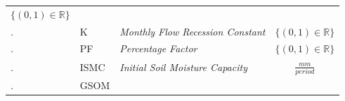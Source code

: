 \documentclass[11pt]{article}
\begin{document}
\begin{longtable}[]{@{}lllc@{}}
\begin{minipage}[t]{0.22\columnwidth}
\(\{\left(0, 1\right) \in\mathbb{R}\}\)\strut
\end{minipage}\tabularnewline
\begin{minipage}[t]{0.22\columnwidth}\raggedright
.\strut
\end{minipage} & \begin{minipage}[t]{0.22\columnwidth}\raggedright
K\strut
\end{minipage} & \begin{minipage}[t]{0.22\columnwidth}\raggedright
\emph{Monthly Flow Recession Constant}\strut
\end{minipage} & \begin{minipage}[t]{0.22\columnwidth}\centering
\(\{\left(0, 1\right) \in\mathbb{R}\}\)\strut
\end{minipage}\tabularnewline
\begin{minipage}[t]{0.22\columnwidth}\raggedright
.\strut
\end{minipage} & \begin{minipage}[t]{0.22\columnwidth}\raggedright
PF\strut
\end{minipage} & \begin{minipage}[t]{0.22\columnwidth}\raggedright
\emph{Percentage Factor}\strut
\end{minipage} & \begin{minipage}[t]{0.22\columnwidth}\centering
\(\{\left(0, 1\right) \in\mathbb{R}\}\)\strut
\end{minipage}\tabularnewline
\begin{minipage}[t]{0.22\columnwidth}\raggedright
.\strut
\end{minipage} & \begin{minipage}[t]{0.22\columnwidth}\raggedright
ISMC\strut
\end{minipage} & \begin{minipage}[t]{0.22\columnwidth}\raggedright
\emph{Initial Soil Moisture Capacity}\strut
\end{minipage} & \begin{minipage}[t]{0.22\columnwidth}\centering
\(\frac{mm}{period}\)\strut
\end{minipage}\tabularnewline
\begin{minipage}[t]{0.22\columnwidth}\raggedright
.\strut
\end{minipage} & \begin{minipage}[t]{0.22\columnwidth}\raggedright
GSOM\strut
\end{minipage} & \begin{minipage}[t]{0.22\columnwidth}\raggedright

\end{minipage}
\end{longtable}
\end{document}
